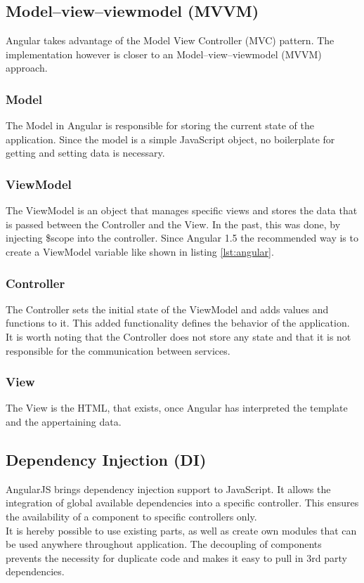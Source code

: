\subsection{Model–view–viewmodel (MVVM)}
Angular takes advantage of the Model View Controller (MVC) pattern. The implementation however is closer to an Model–view–viewmodel (MVVM) approach. 

\subsubsection{Model}
The Model in Angular is responsible for storing the current state of the application. Since the model is a simple JavaScript object, no boilerplate for getting and setting data is necessary.

\subsubsection{ViewModel}
The ViewModel is an object that manages specific views and stores the data that is passed between the Controller and the View. In the past, this was done, by injecting \$scope into the controller. Since Angular 1.5 the recommended way is to create a ViewModel variable like shown in listing \ref{lst:angular}.

\subsubsection{Controller}
The Controller sets the initial state of the ViewModel and adds values and functions to it. This added functionality defines the behavior of the application. It is worth noting that the Controller does not store any state and that it is not responsible for the communication between services.

\subsubsection{View}
The View is the HTML, that exists, once Angular has interpreted the template and the appertaining data.

\subsection{Dependency Injection (DI)}
AngularJS brings dependency injection support to JavaScript. It allows the integration of global available dependencies into a specific controller. This ensures the availability of a component to specific controllers only.\\
It is hereby possible to use existing parts, as well as create own modules that can be used anywhere throughout application. The decoupling of components prevents the necessity for duplicate code and makes it easy to pull in 3rd party dependencies.  

